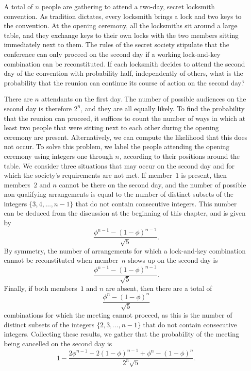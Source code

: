 \begin{example}
A total of $n$ people are gathering to attend a two-day, secret locksmith convention.
As tradition dictates, every locksmith brings a lock and two keys to the convention.
At the opening ceremony, all the locksmiths sit around a large table, and they exchange keys to their own locks with the two members sitting immediately next to them.
The rules of the secret society stipulate that the conference can only proceed on the second day if a working lock-and-key combination can be reconstituted.
If each locksmith decides to attend the second day of the convention with probability half, independently of others, what is the probability that the reunion can continue its course of action on the second day?

There are $n$ attendants on the first day.
The number of possible audiences on the second day is therefore $2^n$, and they are all equally likely.
To find the probability that the reunion can proceed, it suffices to count the number of ways in which at least two people that were sitting next to each other during the opening ceremony are present.
Alternatively, we can compute the likelihood that this does not occur.
To solve this problem, we label the people attending the opening ceremony using integers one through $n$, according to their positions around the table.
We consider three situations that may occur on the second day and for which the society's requirements are not met.
If member~$1$ is present, then members~$2$ and $n$ cannot be there on the second day, and the number of possible non-qualifying arrangements is equal to the number of distinct subsets of the integers $\{3, 4,\ldots, n-1\}$ that do not contain consecutive integers.
This number can be deduced from the discussion at the beginning of this chapter, and is given by
\begin{equation*}
\frac{ \phi^{n-1} - (1 - \phi)^{n-1} }{ \sqrt{5} } .
\end{equation*}
By symmetry, the number of arrangements for which a lock-and-key combination cannot be reconstituted when member~$n$ shows up on the second day is
\begin{equation*}
\frac{ \phi^{n-1} - (1 - \phi)^{n-1} }{ \sqrt{5} } .
\end{equation*}
Finally, if both members~$1$ and $n$ are absent, then there are a total of
\begin{equation*}
\frac{ \phi^{n} - (1 - \phi)^{n} }{ \sqrt{5} }
\end{equation*}
combinations for which the meeting cannot proceed, as this is the number of distinct subsets of the integers $\{ 2, 3, \ldots, n-1 \}$ that do not contain consecutive integers.
Collecting these results, we gather that the probability of the meeting being cancelled on the second day is
\begin{equation*}
1 - \frac{ 2 \phi^{n-1} - 2 (1 - \phi)^{n-1}
+ \phi^{n} - (1 - \phi)^{n} }{2^n \sqrt{5}} .
\end{equation*}
\end{example}


